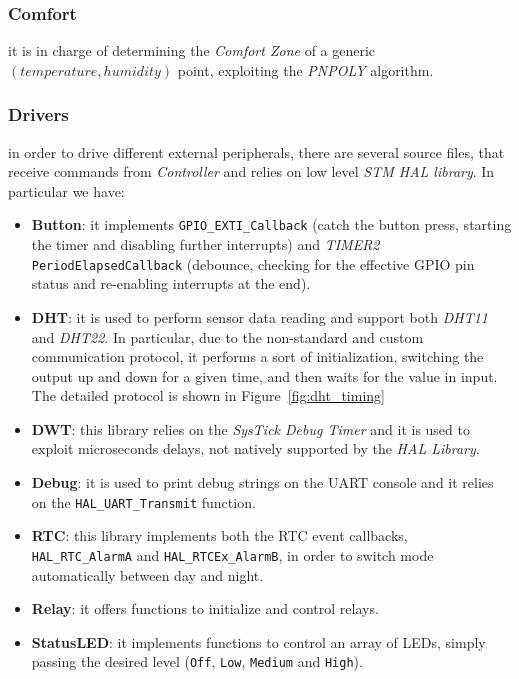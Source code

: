 \documentclass[peerreview]{IEEEtran}
\begin{document}
\subsubsection{Comfort}
it is in charge of determining the \emph{Comfort Zone} of a generic
$(temperature, humidity)$ point, exploiting the \emph{PNPOLY} algorithm.
\subsubsection{Drivers}
in order to drive different external peripherals, there are several source files, that 
receive commands from \emph{Controller} and relies on low level \emph{STM HAL library}.
In particular we have:
\begin{itemize}
	\item \textbf{Button}: it implements
		\texttt{GPIO\_EXTI\_Callback} (catch the button press, starting
		the timer and disabling further interrupts) and \emph{TIMER2}
		\texttt{PeriodElapsedCallback} (debounce, checking for the
		effective GPIO pin status and re-enabling interrupts at the end).
	\item \textbf{DHT}: it is used to perform sensor data reading and support
		both \emph{DHT11} and \emph{DHT22}. In particular, due to the
		non-standard and custom communication protocol, it performs a
		sort of initialization, switching the output up and down for a
		given time, and then waits for the value in input. The detailed protocol
		is shown in Figure~\ref{fig:dht_timing}
	\item \textbf{DWT}: this library relies on the \emph{SysTick Debug Timer}
		and it is used to exploit microseconds delays, not natively
		supported by the \emph{HAL Library}.
	\item \textbf{Debug}: it is used to print debug strings on the UART console 
        and it relies on the \texttt{HAL\_UART\_Transmit} function.
	\item \textbf{RTC}: this library implements both the RTC event callbacks,
	    \texttt{HAL\_RTC\_AlarmA} and \texttt{HAL\_RTCEx\_AlarmB},
	    in order to switch mode automatically between day and night.
	\item \textbf{Relay}: it offers functions to initialize and control relays.
	\item \textbf{StatusLED}: it implements functions to control an array of
		LEDs, simply passing the desired level (\texttt{Off}, \texttt{Low},
		\texttt{Medium}	and \texttt{High}).
\end{itemize}
\end{document}

